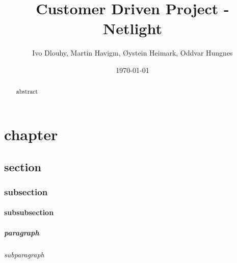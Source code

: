 \documentclass[10pt,a4paper,oneside]{report}
\begin{document}
\title{Customer Driven Project - Netlight}
\author{Ivo Dlouhy, Martin Havigm, Øystein Heimark, Oddvar Hungnes}
\date{\today}
\maketitle

\setcounter{tocdepth}{4}
\tableofcontents
\clearpage
\listoffigures

\begin{abstract}
abstract
\end{abstract}

\chapter{chapter}
\section{section}
\subsection{subsection}
\subsubsection{subsubsection}
\paragraph{paragraph}
\subparagraph{subparagraph}
\end{document}
